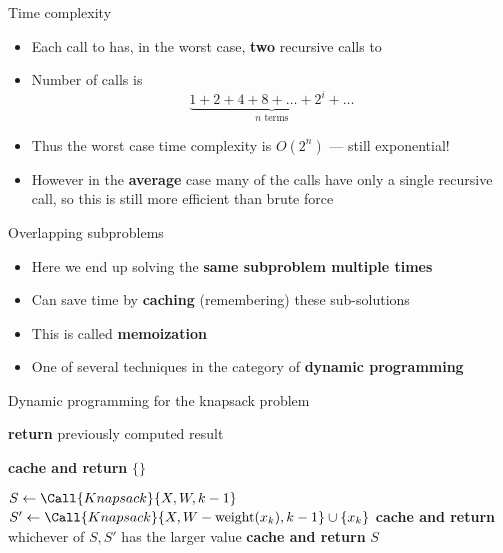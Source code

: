\begin{frame}{Time complexity}
	\begin{itemize}
		\pause\item Each call to  has, in the worst case, \textbf{two} recursive calls to 
		\pause\item Number of calls is
			$$ \underbrace{1 + 2 + 4 + 8 + \dots + 2^i + \dots}_{\text{$n$ terms}} $$
		\pause\item Thus the worst case time complexity is $O(2^n)$ --- still exponential!
		\pause\item However in the \textbf{average} case many of the calls have only a single recursive call,
			so this is still more efficient than brute force
	\end{itemize}
\end{frame}

\begin{frame}{Overlapping subproblems}
	\begin{itemize}
		\pause\item Here we end up solving the \textbf{same subproblem multiple times}
		\pause\item Can save time by \textbf{caching} (remembering) these sub-solutions
		\pause\item This is called \textbf{memoization}
		\pause\item One of several techniques in the category of \textbf{dynamic programming}
	\end{itemize}
\end{frame}

\begin{frame}{Dynamic programming for the knapsack problem}
	\begin{algorithmic}
		\pause{}
			\pause{}
				\pause\State \textbf{return} previously computed result
			\pause\EndIf
			
			\pause{}
				\State \textbf{cache and return} $\{\}$
			\EndIf
			
			\State $S \gets \Call{Knapsack}{X, W, k-1}$
				\State $S' \gets \Call{Knapsack}{X, W - \weight(x_k), k-1} \cup \{x_k\}$
				\State \textbf{cache and return} whichever of $S,S'$ has the larger value
			\Else
				\State \textbf{cache and return} $S$
			\EndIf
		\EndProcedure
	\end{algorithmic}
\end{frame}

